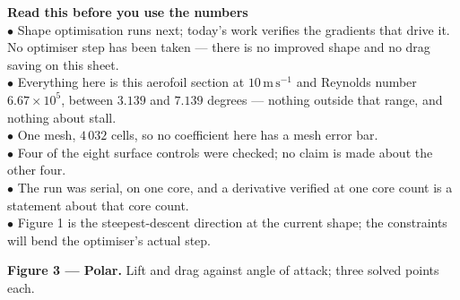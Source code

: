 \documentclass[9pt,a4paper]{article}
\renewcommand{\footnotesize}{\fontsize{6.4}{6.85}\selectfont}
\begin{document}
\begin{minipage}[t]{0.375\textwidth}
\colorbox{boxgrey}{\begin{minipage}[t]{0.955\textwidth}
{\footnotesize\textbf{Read this before you use the numbers}\\[1pt]
$\bullet$ Shape optimisation runs next; today's work verifies the gradients
that drive it. No optimiser step has been taken --- there is no improved shape
and no drag saving on this sheet.\\
$\bullet$ Everything here is this aerofoil section at $10\,\mathrm{m\,s^{-1}}$
and Reynolds number $6.67\times10^{5}$, between $3.139$ and $7.139$ degrees ---
nothing outside that range, and nothing about stall.\\
$\bullet$ One mesh, $4\,032$ cells, so no coefficient here has a mesh error bar.\\
$\bullet$ Four of the eight surface controls were checked; no claim is made
about the other four.\\
$\bullet$ The run was serial, on one core, and a derivative verified at one
core count is a statement about that core count.\\
$\bullet$ Figure 1 is the steepest-descent direction at the current shape; the
constraints will bend the optimiser's actual step.}
\end{minipage}}

\vspace{3pt}
\textbf{Figure 3 --- Polar.} Lift and drag against angle of attack; three
solved points each.


\end{minipage}
\end{document}
